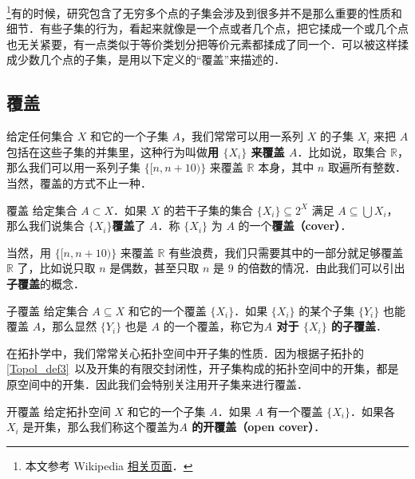 

\footnote{本文参考 Wikipedia \href{https://en.wikipedia.org/wiki/Sequentially_compact_space}{相关页面}．}有的时候，研究包含了无穷多个点的子集会涉及到很多并不是那么重要的性质和细节．有些子集的行为，看起来就像是一个点或者几个点，把它揉成一个或几个点也无关紧要，有一点类似于等价类划分把等价元素都揉成了同一个．可以被这样揉成少数几个点的子集，是用以下定义的“覆盖”来描述的．

\subsection{覆盖}

给定任何集合 $X$ 和它的一个子集 $A$，我们常常可以用一系列 $X$ 的子集 $X_i$ 来把 $A$ 包括在这些子集的并集里，这种行为叫做\textbf{用 $\{X_i\}$ 来覆盖 $A$}．比如说，取集合 $\mathbb{R}$，那么我们可以用一系列子集 $\{[n, n+10)\}$ 来覆盖 $\mathbb{R}$ 本身，其中 $n$ 取遍所有整数．当然，覆盖的方式不止一种．

\begin{definition}{覆盖}
给定集合 $A\subset X$．如果 $X$ 的若干子集的集合 $\{X_i\}\subseteq 2^X$ 满足 $A\subseteq\bigcup X_i$，那么我们说集合 $\{X_i\}$\textbf{覆盖}了 $A$．称 $\{X_i\}$ 为 $A$ 的一个\textbf{覆盖（cover）}．
\end{definition}

当然，用 $\{[n, n+10)\}$ 来覆盖 $\mathbb{R}$ 有些浪费，我们只需要其中的一部分就足够覆盖 $\mathbb{R}$ 了，比如说只取 $n$ 是偶数，甚至只取 $n$ 是 $9$ 的倍数的情况．由此我们可以引出\textbf{子覆盖}的概念．

\begin{definition}{子覆盖}
给定集合 $A\subseteq X$ 和它的一个覆盖 $\{X_i\}$．如果 $\{X_i\}$ 的某个子集 $\{Y_i\}$ 也能覆盖 $A$，那么显然 $\{Y_i\}$ 也是 $A$ 的一个覆盖，称它为\textbf{$A$ 对于 $\{X_i\}$ 的子覆盖}．
\end{definition}

在拓扑学中，我们常常关心拓扑空间中开子集的性质．因为根据子拓扑的\autoref{Topol_def3}~以及开集的有限交封闭性，开子集构成的拓扑空间中的开集，都是原空间中的开集．因此我们会特别关注用开子集来进行覆盖．

\begin{definition}{开覆盖}
给定拓扑空间 $X$ 和它的一个子集 $A$．如果 $A$ 有一个覆盖 $\{X_i\}$．如果各 $X_i$ 是开集，那么我们称这个覆盖为\textbf{$A$ 的开覆盖（open cover）}．
\end{definition}

